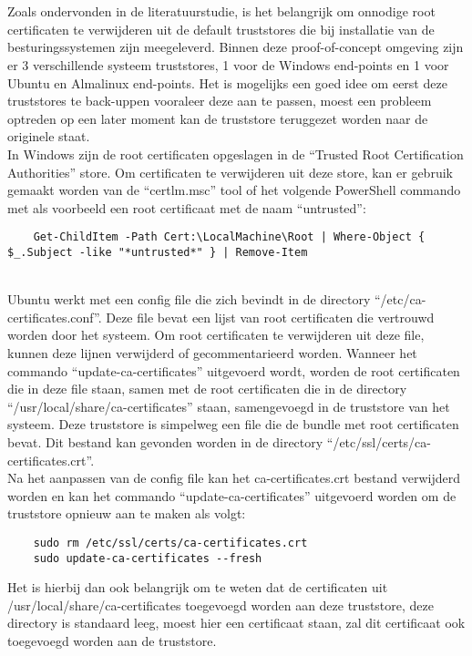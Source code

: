 \section{}%
\label{sec:Preparing_truststores}
Zoals ondervonden in de literatuurstudie, is het belangrijk om onnodige root certificaten te verwijderen uit de default truststores die bij installatie van de besturingssystemen zijn meegeleverd. Binnen deze proof-of-concept omgeving zijn er 3 verschillende systeem truststores, 1 voor de Windows end-points en 1 voor Ubuntu en Almalinux end-points.
Het is mogelijks een goed idee om eerst deze truststores te back-uppen vooraleer deze aan te passen, moest een probleem optreden op een later moment kan de truststore teruggezet worden naar de originele staat. \\

In Windows zijn de root certificaten opgeslagen in de ``Trusted Root Certification Authorities'' store. Om certificaten te verwijderen uit deze store, kan er gebruik gemaakt worden van de ``certlm.msc'' tool of het volgende PowerShell commando met als voorbeeld een root certificaat met de naam ``untrusted'':
\begin{verbatim}
    Get-ChildItem -Path Cert:\LocalMachine\Root | Where-Object { $_.Subject -like "*untrusted*" } | Remove-Item
\end{verbatim}
\\

Ubuntu werkt met een config file die zich bevindt in de directory ``/etc/ca-certificates.conf''. Deze file bevat een lijst van root certificaten die vertrouwd worden door het systeem. Om root certificaten te verwijderen uit deze file, kunnen deze lijnen verwijderd of gecommentarieerd worden.
Wanneer het commando ``update-ca-certificates'' uitgevoerd wordt, worden de root certificaten die in deze file staan, samen met de root certificaten die in de directory ``/usr/local/share/ca-certificates'' staan, samengevoegd in de truststore van het systeem. Deze truststore is simpelweg een file die de bundle met root certificaten bevat. 
Dit bestand kan gevonden worden in de directory ``/etc/ssl/certs/ca-certificates.crt''. \\

Na het aanpassen van de config file kan het ca-certificates.crt bestand verwijderd worden en kan het commando ``update-ca-certificates'' uitgevoerd worden om de truststore opnieuw aan te maken als volgt:
\begin{verbatim}
    sudo rm /etc/ssl/certs/ca-certificates.crt
    sudo update-ca-certificates --fresh
\end{verbatim}
Het is hierbij dan ook belangrijk om te weten dat de certificaten uit /usr/local/share/ca-certificates toegevoegd worden aan deze truststore, deze directory is standaard leeg, moest hier een certificaat staan, zal dit certificaat ook toegevoegd worden aan de truststore. \\

